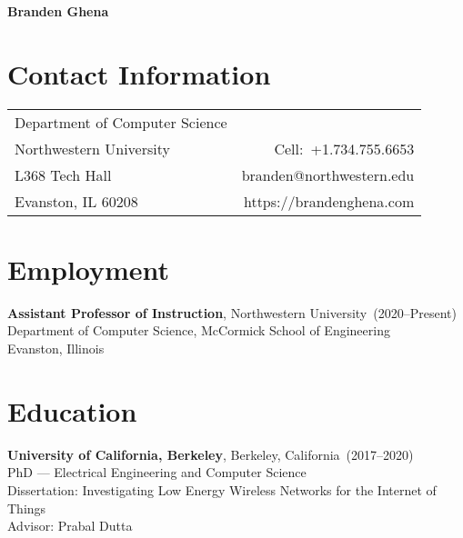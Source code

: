 \documentclass{article}
\begin{document}

\nocite{*}

\begin{center}
    \Huge{\bf{Branden Ghena}} \\
\end{center}

\section*{Contact Information}

\begin{table}[H]
\centering
\vspace*{-16pt}
\begin{tabularx}{\linewidth}{@{} X r @{}}
    {Department of Computer Science}     & {} \\
    {Northwestern University}   & {Cell:~+1.734.755.6653} \\
    {L368 Tech Hall} & {branden@northwestern.edu} \\
    {Evanston, IL 60208} & {https://brandenghena.com} \\
\end{tabularx}
\end{table}

\section*{Employment}
\vspace{-6pt}

{\bf Assistant Professor of Instruction}, Northwestern University~(2020--Present) \\
Department of Computer Science, McCormick School of Engineering \\
Evanston, Illinois


\section*{Education}
\vspace{-6pt}

{\bf University of California, Berkeley}, Berkeley, California~(2017--2020) \\
PhD --- Electrical Engineering and Computer Science \\
Dissertation: Investigating Low Energy Wireless Networks for the Internet of Things \\
Advisor: Prabal Dutta
\end{document}
